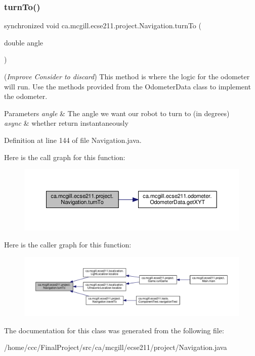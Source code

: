 \subsubsection{\texorpdfstring{turn\+To()}{turnTo()}}
{\footnotesize\ttfamily synchronized void ca.\+mcgill.\+ecse211.\+project.\+Navigation.\+turn\+To (\begin{DoxyParamCaption}\item[{double}]{angle }\end{DoxyParamCaption})}

({\itshape Improve} {\itshape Consider to discard}) This method is where the logic for the odometer will run. Use the methods provided from the Odometer\+Data class to implement the odometer.


\begin{DoxyParams}{Parameters}
{\em angle} & The angle we want our robot to turn to (in degrees) \\
\hline
{\em async} & whether return instantaneously \\
\hline
\end{DoxyParams}


Definition at line 144 of file Navigation.\+java.

Here is the call graph for this function\+:
\nopagebreak
\begin{figure}[H]
\begin{center}
\leavevmode
\includegraphics[width=350pt]{classca_1_1mcgill_1_1ecse211_1_1project_1_1_navigation_a3bbe0645f2b3b3d0986b4a707fb5a00c_cgraph}
\end{center}
\end{figure}
Here is the caller graph for this function\+:
\nopagebreak
\begin{figure}[H]
\begin{center}
\leavevmode
\includegraphics[width=350pt]{classca_1_1mcgill_1_1ecse211_1_1project_1_1_navigation_a3bbe0645f2b3b3d0986b4a707fb5a00c_icgraph}
\end{center}
\end{figure}


The documentation for this class was generated from the following file\+:\begin{DoxyCompactItemize}
\item 
/home/ccc/\+Final\+Project/src/ca/mcgill/ecse211/project/Navigation.\+java\end{DoxyCompactItemize}
